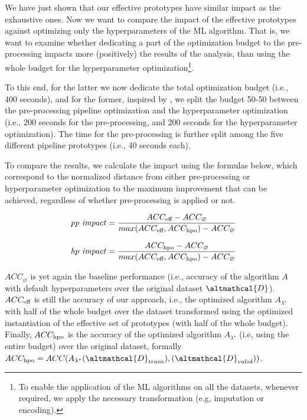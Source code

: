 We have just shown that our effective prototypes have similar impact as the exhaustive ones.
Now we want to compare the impact of the effective prototypes against optimizing only the hyperparameters of the ML algorithm.
That is, we want to examine whether dedicating a part of the optimization budget to the pre-processing impacts more (positively) the results of the analysis, than using the whole budget for the hyperparameter optimization\footnote{To enable the application of the ML algorithms on all the datasets, whenever required, we apply the necessary transformation (e.g, imputation or encoding).}.

To this end, for the latter we now dedicate the total optimization budget (i.e., 400 seconds), and for the former, inspired by \cite{Quemy20InfSystems}, we split the budget 50-50 between the pre-processing pipeline optimization and the hyperparameter optimization (i.e., 200 seconds for the pre-processing, and 200 seconds for the hyperparameter optimization).
The time for the pre-processing is further split among the five different pipeline prototypes (i.e., 40 seconds each).

To compare the results, we calculate the impact using the formulas below, which correspond to the normalized distance from either pre-processing or hyperparameter optimization to the maximum improvement that can be achieved, regardless of whether pre-processing is applied or not.

\begin{equation*}
    \text{\textit{pp impact}} = \frac{ACC_{\textup{eff}} - ACC_{\varnothing}}{max(ACC_{\textup{eff}}, ACC_{\textup{hpo}}) - ACC_{\varnothing}}
\end{equation*}

\begin{equation*}
    \text{\textit{hp impact}} = \frac{ACC_{\textup{hpo}} - ACC_{\varnothing}}{max(ACC_{\textup{eff}}, ACC_{\textup{hpo}}) - ACC_{\varnothing}}
\end{equation*}

$ACC_{\varnothing}$ is yet again the baseline performance (i.e., accuracy of the algorithm $A$ with default hyperparameters over the original dataset $\altmathcal{D}$).
$ACC_{\textup{eff}}$ is still the accuracy of our approach, i.e., the optimized algorithm $A_{{\lambda}^{\star}}$ with half of the whole budget over the dataset transformed using the optimized instantiation of the effective set of prototypes (with half of the whole budget).
Finally, $ACC_{\textup{hpo}}$ is the accuracy of the optimized algorithm $A_{{\lambda}^{\star}}$ (i.e, using the entire budget) over the original dataset, formally $ACC_{\textup{hpo}} = ACC(A_{{\lambda}^{\star}}(\altmathcal{D}_{train}), (\altmathcal{D}_{valid}))$.

